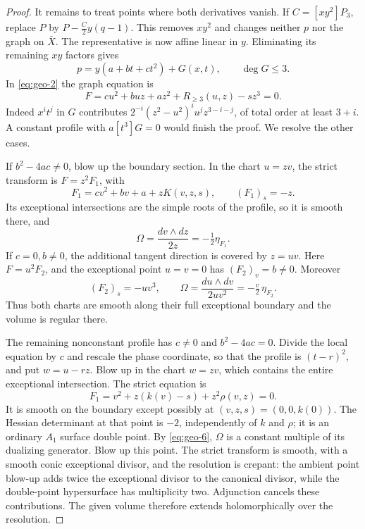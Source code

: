 \begin{proof}
It remains to treat points where both derivatives vanish.
If \(C=[xy^2]P_3\), replace \(P\) by
\(P-\frac C2y(q-1)\). This removes \(xy^2\) and changes neither
\(p\) nor the graph on \(\bar X\). The representative is now affine
linear in \(y\). Eliminating its remaining \(xy\) factors gives
\[
 p=y(a+bt+ct^2)+G(x,t),\qquad \deg G\leq3.
\]
In \eqref{eq:geo-2} the graph equation is
\begin{equation}\label{eq:geo-5}
F=cu^2+buz+az^2+R_{\geq3}(u,z)-sz^3=0.
\end{equation}
Indeed \(x^it^j\) in \(G\) contributes
\(2^{-i}(z^2-u^2)^iu^jz^{3-i-j}\), of total order at least \(3+i\).
A constant profile with \(a[t^3]G=0\) would finish the proof. We resolve the other cases.

If \(b^2-4ac\neq0\), blow up the boundary section.
In the chart \(u=zv\), the strict transform is \(F=z^2F_1\), with
\[
 F_1=cv^2+bv+a+zK(v,z,s),\qquad (F_1)_s=-z.
\]
Its exceptional intersections are the simple roots of the profile,
so it is smooth there, and
\begin{equation}\label{eq:geo-6}
\Omega=\frac{dv\wedge dz}{2z}=-\tfrac12\eta_{F_1}.
\end{equation}
If \(c=0,b\neq0\), the additional tangent direction is covered by
\(z=uv\). Here \(F=u^2F_2\), and the exceptional point \(u=v=0\)
has \((F_2)_v=b\neq0\). Moreover
\begin{equation}\label{eq:geo-7}
(F_2)_s=-uv^3,\qquad
 \Omega=\frac{du\wedge dv}{2uv^2}=-\tfrac v2\,\eta_{F_2}.
\end{equation}
Thus both charts are smooth along their full exceptional boundary
and the volume is regular there.

The remaining nonconstant profile has \(c\neq0\) and
\(b^2-4ac=0\). Divide the local equation by \(c\) and rescale the phase coordinate, so that the profile is \((t-r)^2\),
and put \(w=u-rz\). Blow up in the chart \(w=zv\), which contains
the entire exceptional intersection. The strict equation is
\begin{equation}\label{eq:geo-8}
F_1=v^2+z(k(v)-s)+z^2\rho(v,z)=0.
\end{equation}
It is smooth on the boundary except possibly at
\((v,z,s)=(0,0,k(0))\).
The Hessian determinant at that point is \(-2\), independently of
\(k\) and \(\rho\); it is an ordinary \(A_1\) surface double point.
By \eqref{eq:geo-6}, \(\Omega\) is a constant multiple of its dualizing generator.
Blow up this point. The strict transform is smooth, with a smooth
conic exceptional divisor, and the resolution is crepant:
the ambient point blow-up adds twice the exceptional divisor to
the canonical divisor, while the double-point hypersurface has
multiplicity two. Adjunction cancels these contributions.
The given volume therefore extends holomorphically over the
resolution.



\end{proof}
